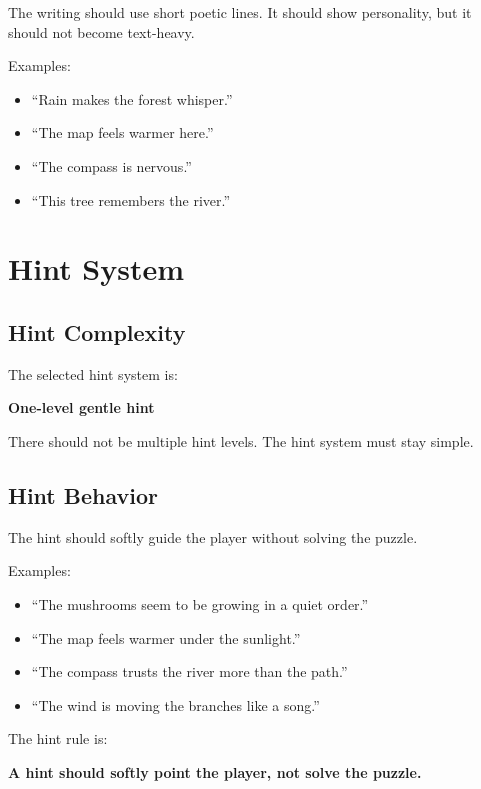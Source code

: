 \documentclass[12pt]{article}
\begin{document}
The writing should use short poetic lines. It should show personality, but it should not become text-heavy.

Examples:

\begin{itemize}[leftmargin=*]
    \item ``Rain makes the forest whisper.''
    \item ``The map feels warmer here.''
    \item ``The compass is nervous.''
    \item ``This tree remembers the river.''
\end{itemize}

\section{Hint System}

\subsection{Hint Complexity}

The selected hint system is:

\begin{center}
\textbf{One-level gentle hint}
\end{center}

There should not be multiple hint levels. The hint system must stay simple.

\subsection{Hint Behavior}

The hint should softly guide the player without solving the puzzle.

Examples:

\begin{itemize}[leftmargin=*]
    \item ``The mushrooms seem to be growing in a quiet order.''
    \item ``The map feels warmer under the sunlight.''
    \item ``The compass trusts the river more than the path.''
    \item ``The wind is moving the branches like a song.''
\end{itemize}

The hint rule is:

\begin{center}
\textbf{A hint should softly point the player, not solve the puzzle.}
\end{center}
\end{document}
